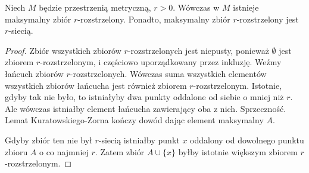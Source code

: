 \begin{lem} \label{lem:anti-net}
  Niech $M$ będzie przestrzenią metryczną, $r > 0$. Wówczas w $M$ istnieje maksymalny zbiór $r$-rozstrzelony. Ponadto, maksymalny zbiór $r$-rozstrzelony jest $r$-siecią.
  \begin{proof}
    Zbiór wszystkich zbiorów $r$-rozstrzelonych jest niepusty, ponieważ $\emptyset$ jest zbiorem $r$-roz\-strze\-lo\-nym, i częściowo uporządkowany przez inkluzję. Weźmy łańcuch zbiorów $r$-rozstrzelonych. Wówczas suma wszystkich elementów wszystkich zbiorów łańcucha jest również zbiorem $r$-roz\-strze\-lo\-nym. Istotnie, gdyby tak nie było, to istniałyby dwa punkty oddalone od siebie o mniej niż $r$. Ale wówczas istniałby element łańcucha zawierający oba z nich. Sprzeczność. Lemat Kuratowskiego-Zorna kończy dowód dając element maksymalny $A$.
    
    Gdyby zbiór ten nie był $r$-siecią istniałby punkt $x$ oddalony od dowolnego punktu zbioru $A$ o co najmniej $r$. Zatem zbiór $A \cup \{x\}$ byłby istotnie większym zbiorem $r$-rozstrzelonym.
  \end{proof}
\end{lem}

